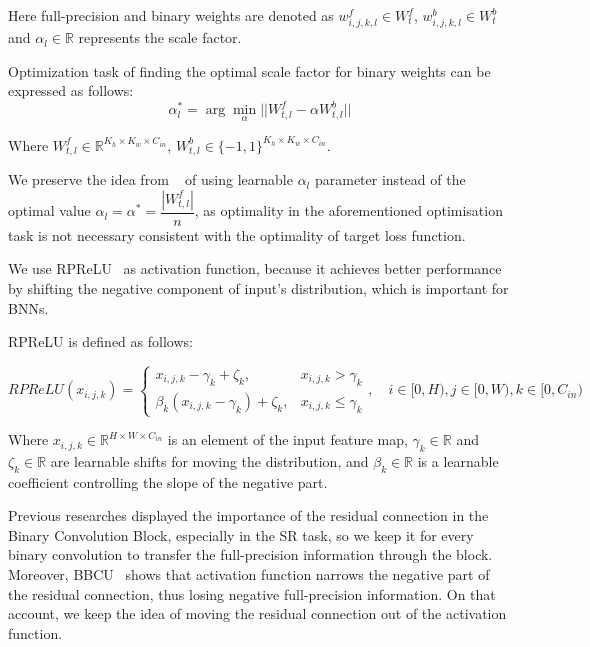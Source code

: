 \documentclass{article}
\begin{document}
Here full-precision and binary weights are denoted as $w_{i, j, k, l}^f \in W_t^f$, $w_{i, j, k, l}^b \in W_t^b$ and $\alpha_l \in \mathbb{R}$ represents the scale factor.

Optimization task of finding the optimal scale factor for binary weights can be expressed as follows:
\begin{equation}
    \alpha_l^* = \arg\min\limits_{\alpha} ||W_{t, l}^f - \alpha W_{t, l}^b||
\end{equation}

Where $W_{t, l}^f \in \mathbb{R}^{K_{h} \times K_{w} \times C_{in}}$, $W_{t, l}^b \in \{-1, 1\}^{K_{h} \times K_{w} \times C_{in}}$. 

We preserve the idea from ~\cite{ma2019efficient} of using learnable $\alpha_l$ parameter instead of the optimal value $\alpha_l = \alpha^* = \dfrac{|W_{t, l}^f|}{n}$, as optimality in the aforementioned optimisation task is not necessary consistent with the optimality of target loss function.

We use RPReLU~\cite{liu2020reactnet} as activation function, because it achieves better performance by shifting the negative component of input's distribution, which is important for BNNs.

RPReLU is defined as follows:

\begin{equation}
    RPReLU(x_{i, j, k}) = 
    \begin{cases}
        x_{i, j, k} - \gamma_{k} + \zeta_{k}, & x_{i, j, k} > \gamma_{k} \\
        \beta_k(x_{i, j, k} - \gamma_k) + \zeta_k, & x_{i, j, k} \le \gamma_k
    \end{cases}, \quad
    i \in [0, H), j \in [0, W), k \in [0, C_{in})
\end{equation}

Where $x_{i, j, k} \in \mathbb{R}^{H \times W \times C_{in}}$ is an element of the input feature map, $\gamma_k \in \mathbb{R}$ and $\zeta_k \in \mathbb{R}$ are learnable shifts for moving the distribution, and $\beta_k \in \mathbb{R}$ is a learnable coefficient controlling the slope of the negative part.

Previous researches displayed the importance of the residual connection in the Binary Convolution Block, especially in the SR task, so we keep it for every binary convolution to transfer the full-precision information through the block. Moreover, BBCU~\cite{xia2022basic} shows that activation function narrows the negative part of the residual connection, thus losing negative full-precision information. On that account, we keep the idea of moving the residual connection out of the activation function.
\end{document}

